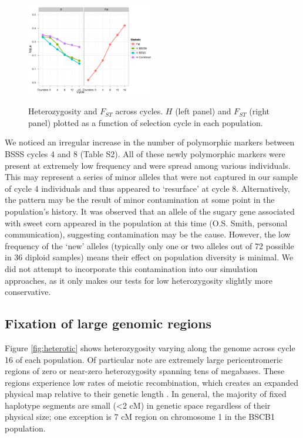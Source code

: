 \begin{figure}[tb]   
  \begin{center}
   \vspace{-0mm}
   \includegraphics[width=0.5\textwidth]{fig2}
   \renewcommand{\baselinestretch}{0.9}
   \vspace{-3mm}
   \caption{Heterozygosity and $F_{ST}$ across cycles. $H$ (left panel) and $F_{ST}$ (right panel) plotted as a function of selection cycle in each population.
} 
\vspace{-6mm}
    \label{fig:decline}
  \end{center}
\end{figure}

We noticed an irregular increase in the number of polymorphic markers between BSSS cycles 4 and 8 (Table S2). 
All of these newly polymorphic markers were present at extremely low frequency and were spread among various individuals. 
This may represent a series of minor alleles that were not captured in our sample of cycle 4 individuals and thus appeared to ‘resurface’ at cycle 8. 
Alternatively, the pattern may be the result of minor contamination at some point in the population’s history. 
It was observed that an allele of the sugary gene associated with sweet corn appeared in the population at this time (O.S. Smith, personal communication), suggesting contamination may be the cause. 
However, the low frequency of the ‘new’ alleles (typically only one or two alleles out of 72 possible in 36 diploid samples) means their effect on population diversity is minimal.  
We did not attempt to incorporate this contamination into our simulation approaches, as it only makes our tests for low heterozygosity slightly more conservative.

\subsection*{Fixation of large genomic regions}
Figure \ref{fig:heterotic} shows heterozygosity varying along the genome across cycle 16 of each population. 
Of particular note are extremely large pericentromeric regions of zero or near-zero heterozygosity spanning tens of megabases. 
These regions experience low rates of meiotic recombination, which creates an expanded physical map relative to their genetic length \citep{ganal2011a-large}. 
In general, the majority of fixed haplotype segments are small (<2 cM) in genetic space regardless of their physical size; one exception is 7 cM region on chromosome 1 in the BSCB1 population. 

